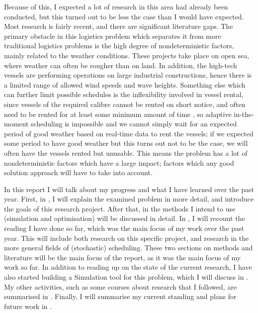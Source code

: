 \documentclass[a4paper,12pt]{article}
\begin{document}
Because of this, I expected a lot of research in this area had already been conducted, but this turned out to be less the case than I would have expected. Most research is fairly recent, and there are significant literature gaps. The primary obstacle in this logistics problem which separates it from more traditional logistics problems is the high degree of nondeterministic factors, mainly related to the weather conditions. These projects take place on open sea, where weather can often be rougher than on land. In addition, the high-tech vessels are performing operations on large industrial constructions, hence there is a limited range of allowed wind speeds and wave heights. Something else which can further limit possible schedules is the inflexibility involved in vessel rental, since vessels of the required calibre cannot be rented on short notice, and often need to be rented for at least some minimum amount of time \cite{kerkhove2017optimised}, so adaptive in-the-moment scheduling is impossible and we cannot simply wait for an expected period of good weather based on real-time data to rent the vessels; if we expected some period to have good weather but this turns out not to be the case, we will often have the vessels rented but unusable. This means the problem has a lot of nondeterministic factors which have a large impact; factors which any good solution approach will have to take into account. 

In this report I will talk about my progress and what I have learned over the past year. First, in , I will explain the examined problem in more detail, and introduce the goals of this research project. After that, in  the methods I intend to use (simulation and optimisation) will be discussed in detail. In , I will recount the reading I have done so far, which was the main focus of my work over the past year. This will include both research on this specific project, and research in the more general fields of (stochastic) scheduling. These two sections on methods and literature will be the main focus of the report, as it was the main focus of my work so far. In addition to reading up on the state of the current research, I have also started building a Simulation tool for this problem, which I will discuss in . My other activities, such as some courses about research that I followed, are summarised in . Finally, I will summarise my current standing and plans for future work in . 

\pagebreak
\end{document}
